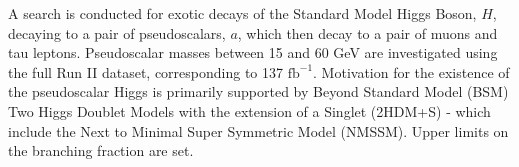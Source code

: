A search is conducted for exotic decays of the Standard Model Higgs Boson, $H$, decaying to a pair of pseudoscalars, $a$, which then decay to a pair of muons and tau leptons. Pseudoscalar masses between 15 and 60 GeV are investigated using the full Run II dataset, corresponding to 137 $\text{fb}^{-1}$. Motivation for the existence of the pseudoscalar Higgs is primarily supported by Beyond Standard Model (BSM) Two Higgs Doublet Models with the extension of a Singlet (2HDM+S) - which include the Next to Minimal Super Symmetric Model (NMSSM). Upper limits on the branching fraction are set.
